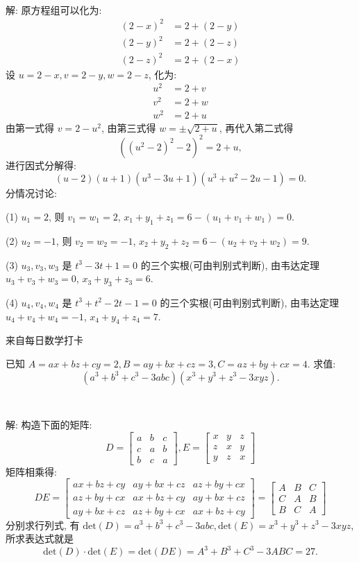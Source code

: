 ~

解: 原方程组可以化为:
\begin{align*}
(2-x)^2 &= 2 + (2-y) \\
(2-y)^2 &= 2 + (2-z)\\
(2-z)^2 &= 2 + (2-x)
\end{align*}
设 $u = 2-x, v = 2-y, w = 2-z$, 化为:
\begin{align*}
u^2 &= 2 + v \\
v^2 &= 2 + w\\
w^2 &= 2 + u
\end{align*}
由第一式得 $v = 2 - u^2$, 由第三式得 $w = \pm\sqrt{2+u}$, 再代入第二式得
\[((u^2-2)^2 - 2)^2 = 2+u  ,\]
进行因式分解得:
\[(u-2)(u+1)(u^3-3u+1)(u^3+u^2-2u-1) = 0 .\]
分情况讨论:

(1) $u_1 = 2$, 则 $v_1 = w_1 = 2$, $x_1+y_1+z_1 = 6 - (u_1+v_1+w_1) = 0.$

(2) $u_2 = -1$, 则 $v_2 = w_2 = -1$, $x_2+y_2+z_2 = 6 - (u_2+v_2+w_2) = 9.$

(3) $u_3, v_3, w_3$ 是 $t^3-3t+1=0$ 的三个实根(可由判别式判断), 由韦达定理 $u_3+v_3+w_3 = 0$, $x_3+y_3+z_3 = 6$.

(4) $u_4, v_4, w_4$ 是 $t^3+t^2-2t-1=0$ 的三个实根(可由判别式判断), 由韦达定理 $u_4+v_4+w_4 = -1$, $x_4+y_4+z_4 = 7$.


\newpage
\noindent 来自每日数学打卡

已知 $A = ax + bz + cy = 2, B = ay + bx + cz = 3, C = az + by + cx = 4$. 求值:
\[(a^3+b^3+c^3-3abc)(x^3+y^3+z^3-3xyz) .\]

~

解: 构造下面的矩阵:
\[
D = \begin{bmatrix}
a & b & c \\
c & a & b \\
b & c & a
\end{bmatrix}, 
E = \begin{bmatrix}
x & y & z \\
z & x & y \\
y & z & x
\end{bmatrix}
\]
矩阵相乘得:
\[
DE = \begin{bmatrix}
ax+bz+cy & ay+bx+cz & az+by+cx \\
az+by+cx & ax+bz+cy & ay+bx+cz \\
ay+bx+cz & az+by+cx & ax+bz+cy 
\end{bmatrix} = 
\begin{bmatrix}
A & B & C\\
C & A & B\\
B & C & A 
\end{bmatrix}
\]
分别求行列式, 有 $\mathrm{det}(D) = a^3 + b^3 + c^3 - 3abc, \mathrm{det}(E) = x^3+y^3+z^3-3xyz$, 所求表达式就是 
\[ \mathrm{det}(D)\cdot\mathrm{det}(E) = \mathrm{det}(DE) = A^3+B^3+C^3-3ABC = 27 . \]


